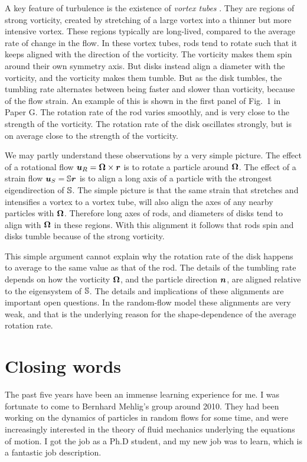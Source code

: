 \documentclass[thesis.tex]{subfiles}
\begin{document}
A key feature of turbulence is the existence of \emph{vortex tubes} \cite{she1990}. They are regions of strong vorticity, created by stretching of a large vortex into a thinner but more intensive vortex. These regions typically are long-lived, compared to the average rate of change in the flow. In these vortex tubes, rods tend to rotate such that it keeps aligned with the direction of the vorticity. The vorticity makes them spin around their own symmetry axis. But disks instead align a diameter with the vorticity, and the vorticity makes them tumble. But as the disk tumbles, the tumbling rate alternates between being faster and slower than vorticity, because of the flow strain. An example of this is shown in the first panel of Fig.~1 in Paper G. The rotation rate of the rod varies smoothly, and is very close to the strength of the vorticity. The rotation rate of the disk oscillates strongly, but is on average close to the strength of the vorticity.

We may partly understand these observations by a very simple picture. The effect of a rotational flow $\mbox{\boldmath$u$}_R= \mbox{\boldmath$\Omega$} \times \mbox{\boldmath$r$}$ is to rotate a particle around $\mbox{\boldmath$\Omega$}$. The effect of a strain flow $\mbox{\boldmath$u$}_S=\mathbb{S} \mbox{\boldmath$r$}$ is to align a long axis of a particle with the strongest eigendirection of $\mathbb{S}$. The simple picture is that the same strain that stretches and intensifies a vortex to a vortex tube, will also align the axes of any nearby particles with $\mbox{\boldmath$\Omega$}$. Therefore long axes of rods, and diameters of disks tend to align with $\mbox{\boldmath$\Omega$}$ in these regions. With this alignment it follows that rods spin and disks tumble because of the strong vorticity.

This simple argument cannot explain why the rotation rate of the disk happens to average to the same value as that of the rod. The details of the tumbling rate depends on how the vorticity $\mbox{\boldmath$\Omega$}$, and the particle direction $\mbox{\boldmath$n$}$, are aligned relative to the eigensystem of $\mathbb{S}$. The details and implications of these alignments are important open questions. In the random-flow model these alignments are very weak, and that is the underlying reason for the shape-dependence of the average rotation rate.

\chapter{Closing words}

The past five years have been an immense learning experience for me. I was fortunate to come to Bernhard Mehlig's group around 2010. They had been working on the dynamics of particles in random flows for some time, and were increasingly interested in the theory of fluid mechanics underlying the equations of motion. I got the job as a Ph.D student, and my new job was to learn, which is a fantastic job description.
\end{document}
